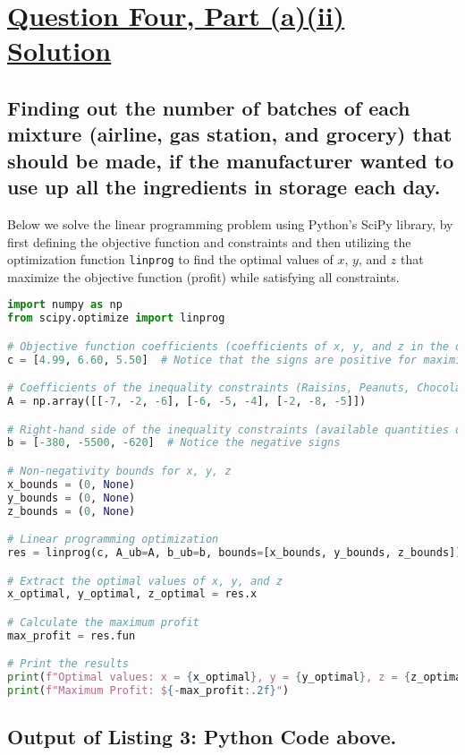 \documentclass{article}
\begin{document}
\section*{\uline{\large Question Four, Part (a)(ii) Solution}}

\subsection*{Finding out the number of batches of each mixture (airline, gas station, and grocery) that should be made, if the manufacturer wanted to use up all the ingredients in storage each day.}
Below we solve the linear programming problem using Python's SciPy library, by first defining the objective function and constraints and then utilizing the optimization function \texttt{linprog} to find the optimal values of $x$, $y$, and $z$ that maximize the objective function (profit) while satisfying all constraints.

\begin{lstlisting}[language=Python, caption={Python Code}]
import numpy as np
from scipy.optimize import linprog

# Objective function coefficients (coefficients of x, y, and z in the objective function)
c = [4.99, 6.60, 5.50]  # Notice that the signs are positive for maximization

# Coefficients of the inequality constraints (Raisins, Peanuts, Chocolate)
A = np.array([[-7, -2, -6], [-6, -5, -4], [-2, -8, -5]])

# Right-hand side of the inequality constraints (available quantities of Raisins, Peanuts, Chocolate)
b = [-380, -5500, -620]  # Notice the negative signs

# Non-negativity bounds for x, y, z
x_bounds = (0, None)
y_bounds = (0, None)
z_bounds = (0, None)

# Linear programming optimization
res = linprog(c, A_ub=A, b_ub=b, bounds=[x_bounds, y_bounds, z_bounds])

# Extract the optimal values of x, y, and z
x_optimal, y_optimal, z_optimal = res.x

# Calculate the maximum profit
max_profit = res.fun

# Print the results
print(f"Optimal values: x = {x_optimal}, y = {y_optimal}, z = {z_optimal}")
print(f"Maximum Profit: ${-max_profit:.2f}")
\end{lstlisting}

\subsection*{Output of Listing 3: Python Code above.}
\end{document}
